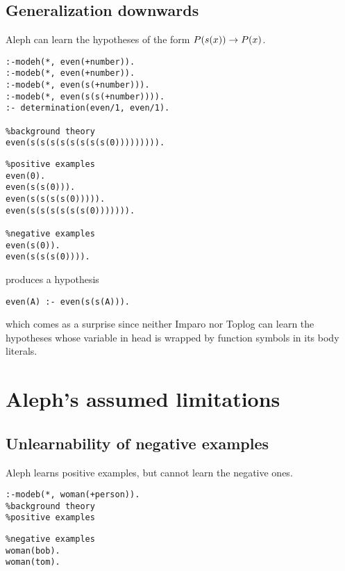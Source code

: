 \subsection{Generalization downwards}
Aleph can learn the hypotheses of the form $P(s(x)) \to P(x)$.

\begin{minipage}[t]{.50\textwidth}
\begin{lstlisting}
:-modeh(*, even(+number)).
:-modeb(*, even(+number)).
:-modeb(*, even(s(+number))).
:-modeb(*, even(s(s(+number)))).
:- determination(even/1, even/1).

%background theory
even(s(s(s(s(s(s(s(s(0))))))))).
\end{lstlisting}
\end{minipage}
\begin{minipage}[t]{.20\textwidth}
\begin{lstlisting}
%positive examples
even(0).
even(s(s(0))).
even(s(s(s(s(0))))).
even(s(s(s(s(s(s(0))))))).

%negative examples
even(s(0)).
even(s(s(s(0)))).
\end{lstlisting}
\end{minipage}

produces a hypothesis
\begin{lstlisting}
even(A) :- even(s(s(A))).
\end{lstlisting}
which comes as a surprise since neither Imparo nor Toplog can learn the hypotheses whose variable in head is wrapped by function symbols in its body literals.

\section{Aleph's assumed limitations}

\subsection{Unlearnability of negative examples}
Aleph learns positive examples, but cannot learn the negative ones.

\begin{minipage}[t]{.50\textwidth}
\begin{lstlisting}
:-modeb(*, woman(+person)).
%background theory
%positive examples
\end{lstlisting}
\end{minipage}
\begin{minipage}[t]{.20\textwidth}
\begin{lstlisting}
%negative examples
woman(bob).
woman(tom).
\end{lstlisting}
\end{minipage}

